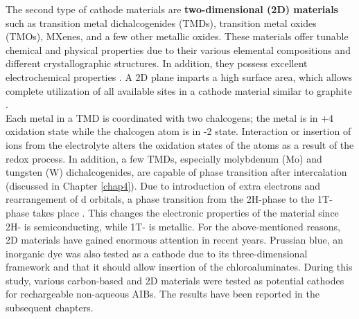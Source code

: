 
The second type of cathode materials are \textbf{two-dimensional (2D) materials} such as transition metal dichalcogenides (TMDs), transition metal oxides (TMOs), MXenes, and a few other metallic oxides. These materials offer tunable chemical and physical properties due to their various elemental compositions and different crystallographic structures. In addition, they possess excellent electrochemical properties \cite{chia_electrochemistry_2015}. A 2D plane imparts a high surface area, which allows complete utilization of all available sites in a cathode material similar to graphite \cite{jia_interfacial_2016,naguib_mxene_2012}.\\ 
Each metal in a TMD is coordinated with two chalcogens; the metal is in +4 oxidation state while the chalcogen atom is in -2 state. Interaction or insertion of ions from the electrolyte alters the oxidation states of the atoms as a result of the redox process. In addition, a few TMDs, especially molybdenum (Mo) and tungsten (W) dichalcogenides, are capable of phase transition after intercalation (discussed in Chapter \ref{chap4}). Due to introduction of extra electrons and rearrangement of d orbitals, a phase transition from the 2H-phase to the 1T-phase takes place \cite{acerce_metallic_2015-1}. This changes the electronic properties of the material since 2H- is semiconducting, while 1T- is metallic. For the above-mentioned reasons, 2D materials have gained enormous attention in recent years. Prussian blue, an inorganic dye was also tested as a cathode due to its three-dimensional framework and that it should allow insertion of the chloroaluminates. 
During this study, various carbon-based and 2D materials were tested as potential cathodes for rechargeable non-aqueous AIBs. The results have been reported in the subsequent chapters.

